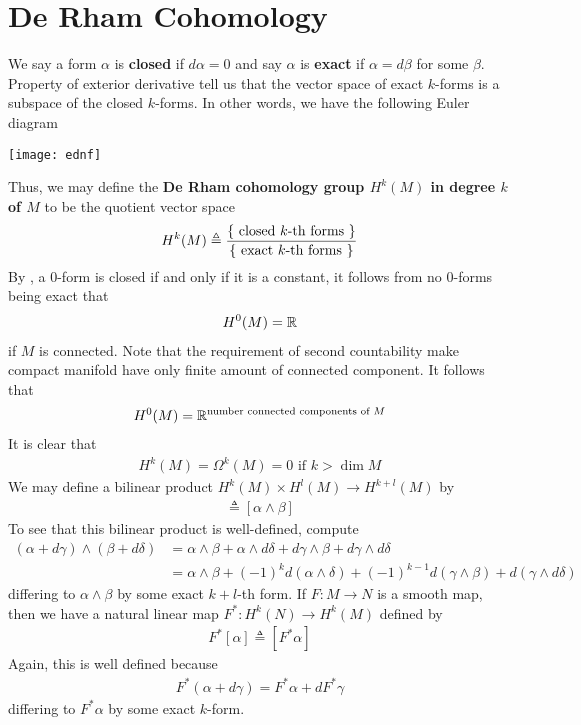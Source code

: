 \documentclass{report}
\begin{document}
\section{De Rham Cohomology}
\begin{mdframed}
We say a form $\alpha $ is \textbf{closed} if $d\alpha =0$ and say $\alpha $ is  \textbf{exact} if $\alpha=d\beta $ for some $\beta $. Property of exterior derivative tell us that the vector space of exact $k$-forms is a subspace of the closed $k$-forms. In other words, we have the following Euler diagram 
\begin{center}
   \begin{minipage}{0.9\linewidth}  
       \centering
\texttt{[image: ednf]}
   \end{minipage}
\end{center}

Thus, we may define the \textbf{De Rham cohomology group $H^k(M)$ in degree $k$ of  $M$} to be the quotient vector space 
\begin{align*}
H^k(M)\triangleq \frac{\{ \text{ closed $k$-th forms } \}}{\{ \text{ exact $k$-th forms } \}}
\end{align*}
By , a 0-form is closed if and only if it is a constant, it follows from no 0-forms being exact that 
\begin{align*}
H^0(M)= \mathbb{R}
\end{align*}
if $M$ is connected. Note that the requirement of second countability make compact manifold have only finite amount of connected component. It follows that 
\begin{align*}
H^0(M)=\mathbb{R}^{\text{number  connected components of }M}
\end{align*}
It is clear that 
\begin{align*}
H^k(M)=\Omega^k(M)=0\text{ if }k>\operatorname{dim}M
\end{align*}
We may define a bilinear product $H^k(M)\times H^l(M)\to H^{k+l}(M)$ by 
\begin{align*}
[\alpha ][\beta ]\triangleq  [\alpha \wedge  \beta ]
\end{align*}
To see that this bilinear product is well-defined, compute 
\begin{align*}
  (\alpha + d\gamma )\wedge  (\beta  + d\delta)&= \alpha \wedge  \beta + \alpha \wedge  d \delta + d\gamma  \wedge  \beta  + d\gamma   \wedge  d\delta     \\
  &= \alpha \wedge  \beta  + (-1)^kd(\alpha \wedge  \delta )  + (-1)^{k-1}d (\gamma \wedge  \beta  )+d(\gamma  \wedge  d \delta )
\end{align*}
differing to $\alpha \wedge  \beta $ by some exact $k+l$-th form. If $F:M\rightarrow N$ is a smooth map, then we have a natural linear map $F^*:H^k(N)\rightarrow H^k(M)$ defined by 
\begin{align*}
F^* [\alpha ]\triangleq [F^* \alpha ]
\end{align*}
Again, this is well defined because 
\begin{align*}
F^*(\alpha +d \gamma )= F^* \alpha +d F^* \gamma  
\end{align*}
differing to $F^*\alpha $ by some exact $k$-form. 
\end{mdframed}
\end{document}
